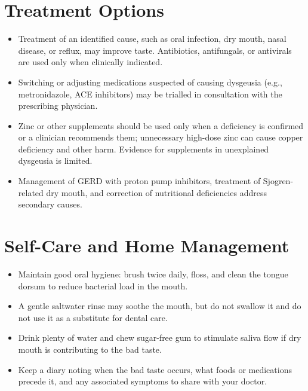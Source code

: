 \section*{Treatment Options}
\begin{itemize}
 \item Treatment of an identified cause, such as oral infection, dry mouth, nasal disease, or reflux, may improve taste. Antibiotics, antifungals, or antivirals are used only when clinically indicated.
 \item Switching or adjusting medications suspected of causing dysgeusia (e.g., metronidazole, ACE inhibitors) may be trialled in consultation with the prescribing physician.
 \item Zinc or other supplements should be used only when a deficiency is confirmed or a clinician recommends them; unnecessary high-dose zinc can cause copper deficiency and other harm. Evidence for supplements in unexplained dysgeusia is limited.
 \item Management of GERD with proton pump inhibitors, treatment of Sjogren-related dry mouth, and correction of nutritional deficiencies address secondary causes.
\end{itemize}

\section*{Self-Care and Home Management}
\begin{itemize}
 \item Maintain good oral hygiene: brush twice daily, floss, and clean the tongue dorsum to reduce bacterial load in the mouth.
 \item A gentle saltwater rinse may soothe the mouth, but do not swallow it and do not use it as a substitute for dental care.
 \item Drink plenty of water and chew sugar-free gum to stimulate saliva flow if dry mouth is contributing to the bad taste.
 \item Keep a diary noting when the bad taste occurs, what foods or medications precede it, and any associated symptoms to share with your doctor.
\end{itemize}

